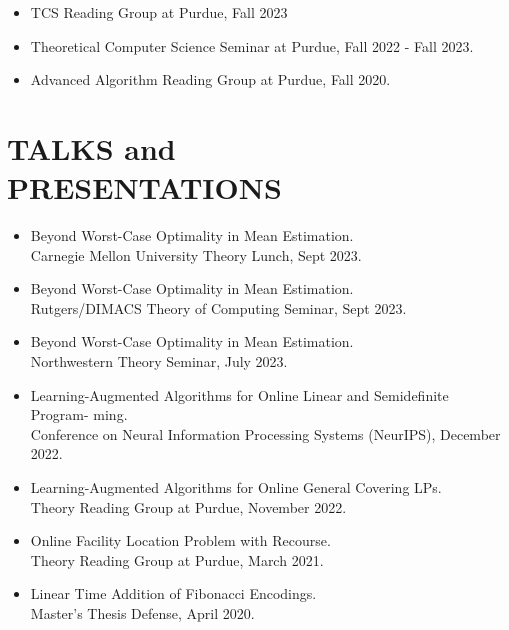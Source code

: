 \documentclass[margin, 10pt]{res} %
\begin{document}
\begin{resume}
\begin{itemize}
\item TCS Reading Group at Purdue, Fall 2023
\item Theoretical Computer Science Seminar at Purdue, Fall 2022 - Fall 2023.
\item Advanced Algorithm Reading Group at Purdue, Fall 2020.
\end{itemize}

\section{TALKS and \\ PRESENTATIONS}
\begin{itemize}
\item Beyond Worst-Case Optimality in Mean Estimation.\\
Carnegie Mellon University Theory Lunch, Sept 2023.
\item Beyond Worst-Case Optimality in Mean Estimation.\\
Rutgers/DIMACS Theory of Computing Seminar, Sept 2023.
\item Beyond Worst-Case Optimality in Mean Estimation.\\
Northwestern Theory Seminar, July 2023.
\item Learning-Augmented Algorithms for Online Linear and Semidefinite Program-
ming.\\
Conference on Neural Information Processing Systems (NeurIPS), December 2022.
\item Learning-Augmented Algorithms for Online General Covering LPs.\\
Theory Reading Group at Purdue, November 2022.
\item Online Facility Location Problem with Recourse.\\
Theory Reading Group at Purdue, March 2021.
\item Linear Time Addition of Fibonacci Encodings.\\
Master's Thesis Defense, April 2020.
\end{itemize}


\end{resume}
\end{document}
